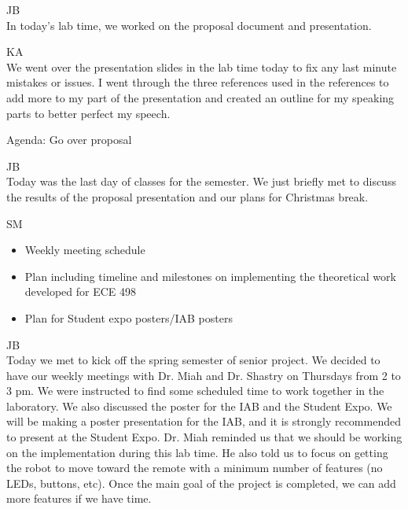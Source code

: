 \documentclass[fontsize=11pt, %
                             paper=letter, %
                             openany, %
                             captions=tableheading,
                             index=totoc,
                             hyperref]{labbook}
\begin{document}
\begin{addmargin}[0cm]{0cm}


JB\\
In today's lab time, we worked on the proposal document and presentation.

\vspace*{12pt}
KA\\
We went over the presentation slides in the lab time today to fix any last minute mistakes or issues. I went through the three references used in the references to add more to my part of the presentation and created an outline for my speaking parts to better perfect my speech.

Agenda: Go over proposal



JB\\
Today was the last day of classes for the semester. We just briefly met to
discuss the results of the proposal presentation and our plans for Christmas
break.


SM\\
\begin{itemize}
  \item Weekly meeting schedule

  \item Plan including timeline and milestones  on implementing the theoretical work developed for ECE 498

  \item Plan for Student expo posters/IAB posters     

\end{itemize}


JB\\
Today we met to kick off the spring semester of senior project. We decided to have our weekly meetings with Dr. Miah and Dr. Shastry on Thursdays from 2 to 3 pm. We were instructed to find some scheduled time to work together in the laboratory. We also discussed the poster for the IAB and the Student Expo. We will be making a poster presentation for the IAB, and it is strongly recommended to present at the Student Expo. Dr. Miah reminded us that we should be working on the implementation during this lab time. He also told us to focus on getting the robot to move toward the remote with a minimum number of features (no LEDs, buttons, etc). Once the main goal of the project is completed, we can add more features if we have time.


\end{addmargin}
\end{document}
